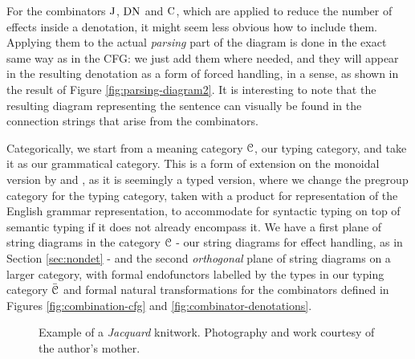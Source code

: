 For the combinators $\text{J}$, $\text{DN}$ and $\text{C}$, which are applied to
reduce the number of effects inside a denotation, it might seem less obvious
how to include them.
Applying them to the actual \emph{parsing} part of the diagram is done
in the exact same way as in the CFG: we just add them where needed, and they
will appear in the resulting denotation as a form of forced handling, in a
sense, as shown in the result of Figure \ref{fig:parsing-diagram2}.
It is interesting to note that the resulting diagram representing
the sentence can visually be found in the connection strings that arise from
the combinators.

\smallskip

Categorically, we start from a meaning category $\mathcal{C}$, our typing category, and
take it as our grammatical category.
This is a form of extension on the monoidal version by
\cite{coeckeMathematicalFoundationsCompositional2010} and
\cite{toumiHigherOrderDisCoCatPeirceLambekMontague2023}, as it is seemingly a
typed version, where we change the pregroup category for the typing category,
taken with a product for representation of the English grammar representation,
to accommodate for syntactic typing on top of semantic typing if it does not
already encompass it.
We have a first plane of string diagrams in the category
$\mathcal{C}$ - our string diagrams for effect handling, as in Section
\ref{sec:nondet} - and the second \emph{orthogonal} plane of string diagrams
on a larger category, with formal endofunctors labelled by the types in our
typing category $\bar{\mathcal{C}}$ and formal natural transformations for the
combinators defined in Figures \ref{fig:combination-cfg} and
\ref{fig:combinator-denotations}.
\begin{figure}
	\centering
	\caption{Example of a \emph{Jacquard} knitwork. Photography and work courtesy
		of the author's mother.}
	\label{fig:knitting-example}
\end{figure}

